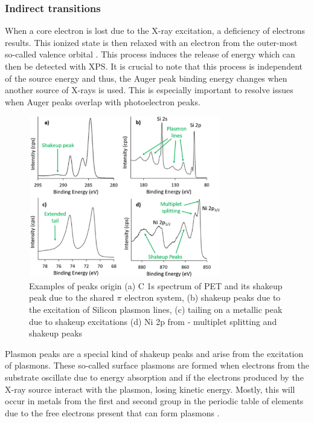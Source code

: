 

\subsubsection{Indirect transitions}
When a core electron is lost due to the X-ray excitation, a deficiency of electrons results. This ionized state is then relaxed with an electron from the outer-most so-called valence orbital \cite{stevie_introduction_2020}. This process induces the release of energy which can then be detected with XPS. It is crucial to note that this process is independent of the source energy and thus, the Auger peak binding energy changes when another source of X-rays is used. This is especially important to resolve issues when Auger peaks overlap with photoelectron peaks.


\begin{figure}[H]
    \centering
    \includegraphics[width=0.75\textwidth]{Figures/peaks.png}
    \caption{Examples of peaks origin (a) C 1s spectrum of PET and its shakeup peak due to the shared $\pi$ electron system, (b) shakeup peaks due to the excitation of Silicon plasmon lines, (c) tailing on a metallic peak due to shakeup excitations (d) Ni 2p from  - multiplet splitting and shakeup peaks \cite{stevie_introduction_2020}}
    \label{fig:peaks}
\end{figure}


Plasmon peaks are a special kind of shakeup peaks and arise from the excitation of plasmons. These so-called surface plasmons are formed when electrons from the substrate oscillate due to energy absorption and if the electrons produced by the X-ray source interact with the plasmon, losing kinetic energy. Mostly, this will occur in metals from the first and second group in the periodic table of elements due to the free electrons present that can form plasmons \cite{moulder_handbook_1992}.



